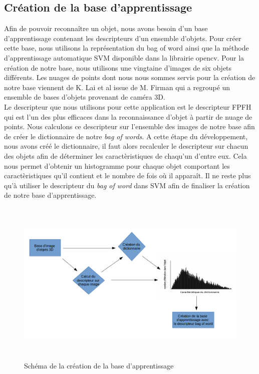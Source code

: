 \subsection{Création de la base d'apprentissage}
Afin de pouvoir reconnaître un objet, nous avons besoin d'un base d'apprentissage contenant les descripteurs d'un ensemble
d'objets. Pour créer cette base, nous utilisons la représentation du \og bag of word \fg ainsi que la méthode d'apprentissage 
automatique SVM\cite{SVM} disponible dans la librairie opencv. Pour la création de notre base, nous utilisons une vingtaine
d'images de six objets différents. Les nuages de points dont nous nous sommes servis pour la création de notre base viennent de 
K. Lai et al\cite{Base1} issue de M. Firman\cite{generalBase} qui a regroupé un ensemble de bases d'objets provenant de caméra 3D.\\

Le descripteur que nous utilisons pour cette application est le descripteur FPFH\cite{FPFH} qui est l'un des plus efficaces dans la
reconnaissance d'objet à partir de nuage de points. Nous calculons ce descripteur sur l'ensemble des images de notre base afin de
créer le dictionnaire de notre \textit{bag of words}. A cette étape du développement, nous avons créé le dictionnaire, il faut alors recalculer
le descripteur sur chacun des objets afin de déterminer les caractèristiques de chaqu'un d'entre eux. Cela nous permet d'obtenir un histogramme
pour chaque objet comportant les caractèristiques qu'il contient et le nombre de fois où il apparaît. Il ne reste plus qu'à utiliser
le descripteur du \textit{bag of word} dans SVM afin de finaliser la création de notre base d'apprentissage.

\begin{figure}[!ht]
  \begin{center}
    \includegraphics[height=8cm]{image/schemaBase.png}
    \caption{Schéma de la création de la base d'apprentissage}
  \end{center}
\end{figure}

